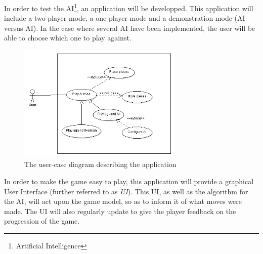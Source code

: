 In order to test the AI\footnote{Artificial Intelligence}, an application will be developped.
This application will include a two-player mode, a one-player mode and a demonstration mode (AI versus AI).
In the case where several AI have been implemented, the user will be able to choose which one to play against.

\begin{figure}[!h]
\centering
\includegraphics[width=0.7\textwidth]{2General_Architecture/2.1Behaviour_of_the_Game/Pictures/Application_UCD}
\caption{The user-case diagram describing the application}
\label{fig:UCD_Play}
\end{figure}

In order to make the game easy to play, this application will provide a graphical User Interface (further referred to as \emph{UI}). %
This UI, as well as the algorithm for the AI, will act upon the game model, so as to inform it of what moves were made.
The UI will also regularly update to give the player feedback on the progression of the game.



